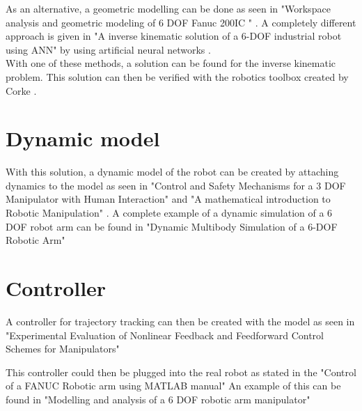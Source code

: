 As an alternative, a geometric modelling can be done as seen in "Workspace analysis and geometric modeling of 6 DOF Fanuc 200IC " \cite{geomModelingKamel}. 
A completely different approach is given in "A inverse kinematic solution of  a 6-DOF industrial robot using ANN" by using artificial neural networks \cite{invKinANNKSHITISH}.\\
%
%
With one of these methods, a solution can be found for the inverse kinematic problem.
This solution can then be verified with the robotics toolbox created by Corke \cite{CorkeRoboticsToolbox}.

\section{Dynamic model}

With this solution, a dynamic model of the robot can be created by attaching dynamics to the model as seen in "Control and Safety Mechanisms for a 3 DOF Manipulator with Human Interaction" \cite{KongWei} and "A mathematical introduction to Robotic Manipulation" \cite{MathIntroRobManip}. A complete example of a dynamic simulation of a 6 \ac{DOF} robot arm can be found in "Dynamic Multibody Simulation of a 6-DOF Robotic Arm" \cite{Dyn6DOFBinLi}

\section{Controller}

A controller for trajectory tracking can then be created with the model as seen in "Experimental Evaluation of Nonlinear Feedback and Feedforward Control Schemes for Manipulators" \cite{evalNonlinFeedForBackControl}

This controller could then be plugged into the real robot as stated in the "Control of a FANUC Robotic arm using MATLAB manual"  \cite{FANUCcontrolMatlab} An example of this can be found in "Modelling and analysis of a 6 DOF robotic arm manipulator" \cite{RobotModelAnalContrexampleJamshed}

